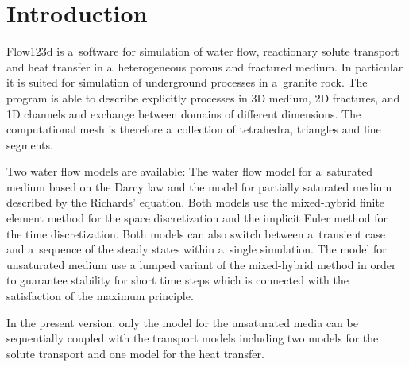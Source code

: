 %
%
%
%
%


\section{Introduction}
Flow123d is a~software for simulation of water flow, reactionary solute transport and heat transfer in a~heterogeneous 
porous and fractured medium. In particular it is suited for simulation of underground processes in a~granite rock.
The program is able to describe explicitly processes in 3D medium, 2D fractures, and 1D channels and exchange between 
domains of different dimensions. The computational mesh is therefore a~collection of tetrahedra, triangles and line segments.

Two water flow models are available: The water flow model for a~saturated medium based on the Darcy law 
and the model for partially saturated medium described by the Richards' equation. 
Both models use the mixed-hybrid finite element method for the space discretization and the implicit Euler method for the time discretization. 
Both models can also switch between a~transient case and a~sequence of the steady states within a~single simulation. The model for unsaturated medium use 
a lumped variant of the mixed-hybrid method in order to guarantee stability for short time steps which is connected with the satisfaction of the maximum principle.

In the present version,  only the model for the unsaturated media can be sequentially coupled  with the transport models including 
two models for the solute transport and one model for the heat transfer.

